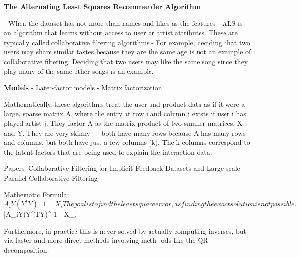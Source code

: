 \textbf{The Alternating Least Squares Recommender Algorithm}

- When the dataset has not more than names and likes as the features
- ALS is an algorithm that learns without access to user or artist attributes. These are
  typically called collaborative filtering algorithms
- For example, deciding that two users
  may share similar tastes because they are the same age is not an example of collaborative
  filtering. Deciding that two users may like the same song since they play many of the
  same other songs is an example.


\textbf{Models}
- Later-factor models
- Matrix factorization

 Mathematically, these algorithms treat the user and product data as if it were a large, sparse
matrix A, where the entry at row i and column j exists if user i has played artist j. They
factor A as the matrix product of two smaller matrices, X and Y. They are very skinny
— both have many rows because A has many rows and columns, but both have just a
few columns (k). The k columns correspond to the latent factors that are being used to
explain the interaction data.


Papers:
Collaborative Filtering for Implicit
Feedback Datasets and Large-scale Parallel Collaborative Filtering

Mathematic Formula:
$$A_iY(Y^TY)^-1 = X_i

The goal is to find the least square error, as finding the exact solution is not possible.
$$|A_iY(Y^TY)^-1 - X_i|

Furthermore, in practice this is never solved by actually computing inverses, but via faster and more direct methods involving meth‐
ods like the QR decomposition.
